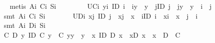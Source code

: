 \begin{isabellebody}
\isadelimproof
\ %
\endisadelimproof
%
\isatagproof
{}\isamarkupfalse%
\ {\isacharparenleft}metis\ A\isactrlsub i\ C\isactrlsub i\ S\isactrlsub i{\isacharparenright}\isanewline
\ \ \ %
%
\endisatagproof
{\isafoldproof}%
%
\isadelimproof
%
\endisadelimproof
\isanewline
\ \ \ \isamarkupfalse%
\ UC\isactrlsub i{\isacharcolon}\ {\isachardoublequoteopen}\isactrlbold {\isasymforall}y{\isachardot}\isactrlbold {\isasymexists}i{\isachardot}\ ID\ i\ \isactrlbold {\isasymand}\ i{\isasymcdot}y\ {\isasymcong}\ y\ \isactrlbold {\isasymand}\ {\isacharparenleft}\isactrlbold {\isasymforall}j{\isachardot}{\isacharparenleft}ID\ j\ \isactrlbold {\isasymand}\ j{\isasymcdot}y\ {\isasymcong}\ y{\isacharparenright}\ \isactrlbold {\isasymrightarrow}\ i\ {\isasymcong}\ j{\isacharparenright}{\isachardoublequoteclose}%
\isadelimproof
\ %
\endisadelimproof
%
\isatagproof
{}\isamarkupfalse%
\ {\isacharparenleft}smt\ A\isactrlsub i\ C\isactrlsub i\ S\isactrlsub i{\isacharparenright}%
\endisatagproof
{\isafoldproof}%
%
\isadelimproof
%
\endisadelimproof
\ \ \isanewline
\ \ \ \isamarkupfalse%
\ UD\isactrlsub i{\isacharcolon}\ {\isachardoublequoteopen}\isactrlbold {\isasymforall}x{\isachardot}\isactrlbold {\isasymexists}j{\isachardot}\ ID\ j\ \isactrlbold {\isasymand}\ x{\isasymcdot}j\ {\isasymcong}\ x\ \isactrlbold {\isasymand}\ {\isacharparenleft}\isactrlbold {\isasymforall}i{\isachardot}{\isacharparenleft}ID\ i\ \isactrlbold {\isasymand}\ x{\isasymcdot}i\ {\isasymcong}\ x{\isacharparenright}\ \isactrlbold {\isasymrightarrow}\ j\ {\isasymcong}\ i{\isacharparenright}{\isachardoublequoteclose}%
\isadelimproof
\ %
\endisadelimproof
%
\isatagproof
{}\isamarkupfalse%
\ {\isacharparenleft}smt\ A\isactrlsub i\ D\isactrlsub i\ S\isactrlsub i{\isacharparenright}\ \ \ \isanewline
\ \ \ %
%
\endisatagproof
{\isafoldproof}%
%
\isadelimproof
%
\endisadelimproof
\isanewline
\ \ \ \isamarkupfalse%
\ {\isachardoublequoteopen}{\isacharparenleft}{\isasymexists}C\ D{\isachardot}\ {\isacharparenleft}\isactrlbold {\isasymforall}y{\isachardot}\ ID\ {\isacharparenleft}C\ y{\isacharparenright}\ \isactrlbold {\isasymand}\ {\isacharparenleft}C\ y{\isacharparenright}{\isasymcdot}y\ {\isasymcong}\ y{\isacharparenright}\ \isactrlbold {\isasymand}\ {\isacharparenleft}\isactrlbold {\isasymforall}x{\isachardot}\ ID\ {\isacharparenleft}D\ x{\isacharparenright}\ \isactrlbold {\isasymand}\ x{\isasymcdot}{\isacharparenleft}D\ x{\isacharparenright}\ {\isasymcong}\ x{\isacharparenright}\ \isactrlbold {\isasymand}\ \isactrlbold {\isasymnot}{\isacharparenleft}D\ \isactrlbold {\isacharequal}\ C{\isacharparenright}{\isacharparenright}{\isachardoublequoteclose}\isanewline

\end{isabellebody}
